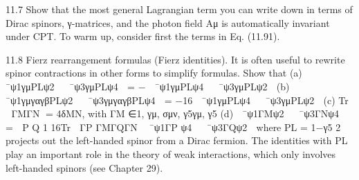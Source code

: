 11.7 Show that the most general Lagrangian term you can write down in terms of Dirac
spinors, γ-matrices, and the photon ﬁeld Aμ is automatically invariant under CPT.
To warm up, consider ﬁrst the terms in Eq. (11.91).

11.8 Fierz rearrangement formulas (Fierz identities). It is often useful to rewrite spinor
contractions in other forms to simplify formulas. Show that
(a)
 ¯ψ1γμPLψ2
  ¯ψ3γμPLψ4

= −
 ¯ψ1γμPLψ4
  ¯ψ3γμPLψ2

(b)
 ¯ψ1γμγαγβPLψ2
  ¯ψ3γμγαγβPLψ4

= −16
 ¯ψ1γμPLψ4
  ¯ψ3γμPLψ2

(c) Tr

ΓMΓN
= 4δMN, with ΓM ∈{1, γμ, σμν, γ5γμ, γ5}
(d)
 ¯ψ1ΓMψ2
  ¯ψ3ΓNψ4

= 
P Q
1
16Tr

ΓP ΓMΓQΓN  ¯ψ1ΓP ψ4
  ¯ψ3ΓQψ2

where PL = 1−γ5
2
projects out the left-handed spinor from a Dirac fermion. The
identities with PL play an important role in the theory of weak interactions, which
only involves left-handed spinors (see Chapter 29).


